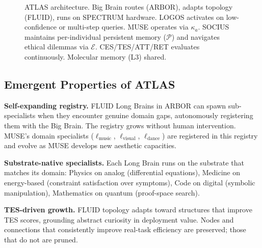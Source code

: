 \documentclass[12pt]{article}
\begin{document}
\begin{figure}[H]
\caption{ATLAS architecture. Big Brain routes (ARBOR), adapts topology (FLUID), runs on SPECTRUM hardware. LOGOS activates on low-confidence or multi-step queries. MUSE operates via $\kappa_a$. SOCIUS maintains per-individual persistent memory ($\mathcal{P}$) and navigates ethical dilemmas via $\mathcal{E}$. CES/TES/ATT/RET evaluates continuously. Molecular memory (L3) shared.}
\label{fig:atlas}
\end{figure}

\subsection{Emergent Properties of ATLAS}

\textbf{Self-expanding registry.} FLUID Long Brains in ARBOR can spawn sub-specialists when they encounter genuine domain gaps, autonomously registering them with the Big Brain. The registry grows without human intervention. MUSE's domain specialists ($\ell_{\text{music}}$, $\ell_{\text{visual}}$, $\ell_{\text{dance}}$) are registered in this registry and evolve as MUSE develops new aesthetic capacities.

\textbf{Substrate-native specialists.} Each Long Brain runs on the substrate that matches its domain: Physics on analog (differential equations), Medicine on energy-based (constraint satisfaction over symptoms), Code on digital (symbolic manipulation), Mathematics on quantum (proof-space search).

\textbf{TES-driven growth.} FLUID topology adapts toward structures that improve TES scores, grounding abstract curiosity in deployment value. Nodes and connections that consistently improve real-task efficiency are preserved; those that do not are pruned.
\end{document}
